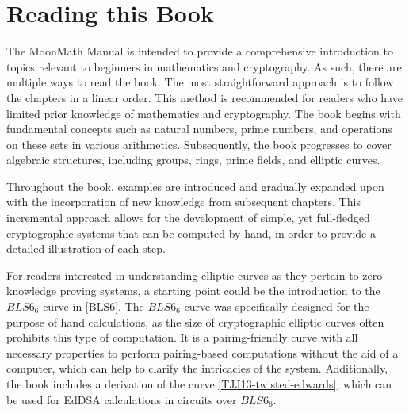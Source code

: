 \section{Reading this Book}
The MoonMath Manual is intended to provide a comprehensive introduction to topics relevant to beginners in mathematics and cryptography. As such, there are multiple ways to read the book. The most straightforward approach is to follow the chapters in a linear order. This method is recommended for readers who have limited prior knowledge of mathematics and cryptography. The book begins with fundamental concepts such as natural numbers, prime numbers, and operations on these sets in various arithmetics. Subsequently, the book progresses to cover algebraic structures, including groups, rings, prime fields, and elliptic curves.

Throughout the book, examples are introduced and gradually expanded upon with the incorporation of new knowledge from subsequent chapters. This incremental approach allows for the development of simple, yet full-fledged cryptographic systems that can be computed by hand, in order to provide a detailed illustration of each step.

For readers interested in understanding elliptic curves as they pertain to zero-knowledge proving systems, a starting point could be the introduction to the $BLS6_6$ curve in \secname{} \ref{BLS6}. The $BLS6_6$ curve was specifically designed for the purpose of hand calculations, as the size of cryptographic elliptic curves often prohibits this type of computation. It is a pairing-friendly curve with all necessary properties to perform pairing-based computations without the aid of a computer, which can help to clarify the intricacies of the system. Additionally, the book includes a derivation of the  curve \ref{TJJ13-twisted-edwards}, which can be used for EdDSA calculations in circuits over $BLS6_6$.


